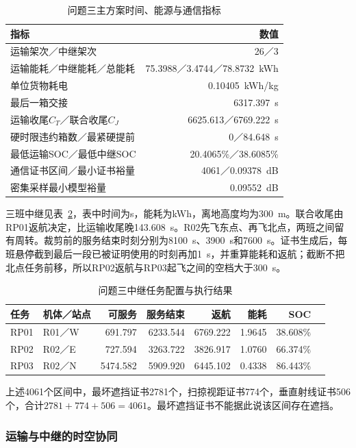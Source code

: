 \begin{table}[H]\centering\small
\caption{问题三主方案时间、能源与通信指标}\label{tab:q3main}
\begin{tabular}{lr}\toprule
指标 & 数值\\\midrule
运输架次／中继架次 & 26／3\\
运输能耗／中继能耗／总能耗 & 75.3988／3.4744／78.8732~kWh\\
单位货物耗电 & 0.10405~kWh/kg\\
最后一箱交接 & 6317.397~s\\
运输收尾$C_T$／联合收尾$C_J$ & 6625.613／6769.222~s\\
硬时限违约箱数／最紧硬提前 & 0／84.648~s\\
最低运输SOC／最低中继SOC & 20.4065\%／38.6085\%\\
通信证书区间／最小证书裕量 & 4061／0.09378~dB\\
密集采样最小模型裕量 & 0.09552~dB\\\bottomrule
\end{tabular}\end{table}

三班中继见表~\ref{tab:relay}，表中时间为s，能耗为kWh，离地高度均为300~m。联合收尾由RP01返航决定，比运输收尾晚143.608~s。R02先飞东点、再飞北点，两班之间留有周转。裁剪前的服务结束时刻分别为8100~s、3900~s和7600~s。证书生成后，每班悬停截到最后一段已被证明使用的时刻再加1~s，并重算能耗和返航；截断不把北点任务前移，所以RP02返航与RP03起飞之间的空档大于300~s。

\begin{table}[H]\centering\scriptsize
\caption{问题三中继任务配置与执行结果}\label{tab:relay}
\begin{tabular}{llrrrrrr}\toprule
任务 & 机体／站点 & 可服务 & 服务结束 & 返航 & 能耗 & SOC\\\midrule
RP01 & R01／W & 691.797 & 6233.544 & 6769.222 & 1.9645 & 38.608\%\\
RP02 & R02／E & 727.594 & 3263.722 & 3826.917 & 1.0760 & 66.374\%\\
RP03 & R02／N & 5474.582 & 5909.920 & 6445.102 & 0.4338 & 86.443\%\\\bottomrule
\end{tabular}\end{table}

上述4061个区间中，最坏遮挡证书2781个，扫掠视距证书774个，垂直射线证书506个，合计$2781+774+506=4061$。最坏遮挡证书不能据此说该区间存在遮挡。

\subsubsection{运输与中继的时空协同}

